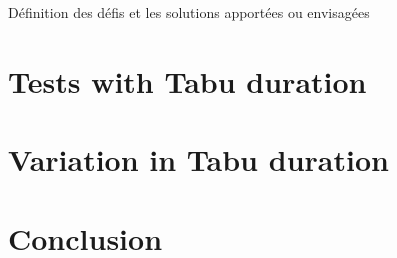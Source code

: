 \documentclass[12pt,oneside,a4paper]{article}
\begin{document}
Définition des défis et les solutions apportées ou envisagées

\section{Tests with Tabu duration}

\section{Variation in Tabu duration}

\section{Conclusion}
\paragraph{}
\end{document}
